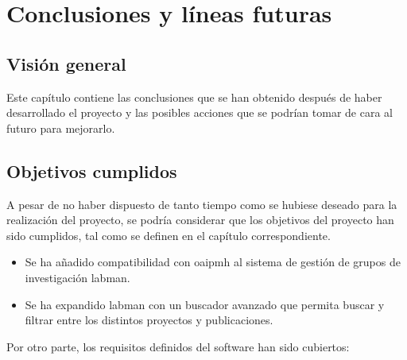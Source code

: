 \chapter{Conclusiones y líneas futuras}

\section{Visión general}

Este capítulo contiene las conclusiones que se han obtenido después de haber desarrollado el proyecto y las posibles acciones que se podrían tomar de cara al futuro para mejorarlo.

\section{Objetivos cumplidos}

A pesar de no haber dispuesto de tanto tiempo como se hubiese deseado para la realización del proyecto, se podría considerar que los objetivos del proyecto han sido cumplidos, tal como se definen en el capítulo correspondiente.

\begin{itemize}
	\item Se ha añadido compatibilidad con \acrshort{oaipmh} al sistema de gestión de grupos de investigación \acrshort{labman}.
	\item Se ha expandido \acrshort{labman} con un buscador avanzado que permita buscar y filtrar entre los distintos proyectos y publicaciones.
\end{itemize}

Por otro parte, los requisitos definidos del software han sido cubiertos:

